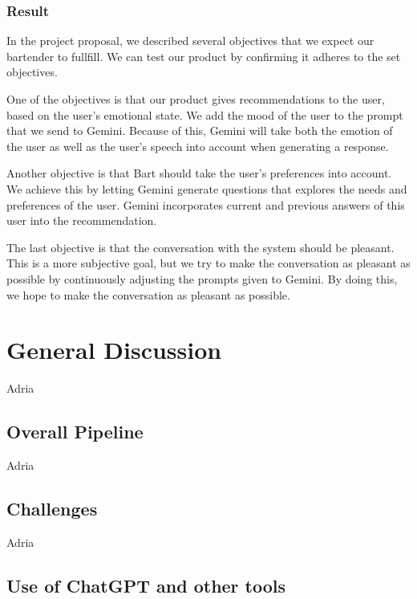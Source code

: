 \documentclass[conference]{IEEEtran}
\begin{document}
\subsubsection{Result}
In the project proposal, we described several objectives that we expect our bartender to fullfill.
We can test our product by confirming it adheres to the set objectives.

One of the objectives is that our product gives recommendations to the user, based on the user's emotional state.
We add the mood of the user to the prompt that we send to Gemini.
Because of this, Gemini will take both the emotion of the user as well as the user's speech into account when generating a response.

Another objective is that Bart should take the user's preferences into account. 
We achieve this by letting Gemini generate questions that explores the needs and preferences of the user.
Gemini incorporates current and previous answers of this user into the recommendation.

The last objective is that the conversation with the system should be pleasant.
This is a more subjective goal, but we try to make the conversation as pleasant as possible by continuously adjusting the prompts given to Gemini.
By doing this, we hope to make the conversation as pleasant as possible.


\section{General Discussion}
Adria
\subsection{Overall Pipeline}
Adria
\subsection{Challenges}
Adria
\subsection{Use of ChatGPT and other tools}
\end{document}
